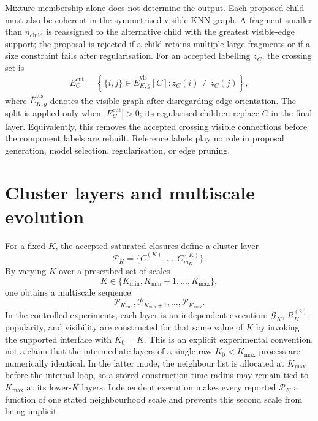 \documentclass[pdflatex,sn-mathphys-num]{sn-jnl}
\newcommand{\calG}{\mathcal{G}}
\newcommand{\calP}{\mathcal{P}}
\begin{document}
Mixture membership alone does not determine the output.  Each proposed child
must also be coherent in the symmetrised visible KNN graph.  A fragment smaller
than $n_{\mathrm{child}}$ is reassigned to the alternative child with the
greatest visible-edge support; the proposal is rejected if a child retains
multiple large fragments or if a size constraint fails after regularisation.
For an accepted labelling $z_C$, the crossing set is
\begin{equation}
E_C^{\mathrm{cut}}=
\left\{\{i,j\}\in\overline E_{K,g}^{\mathrm{vis}}[C]:
z_C(i)\neq z_C(j)\right\},
\label{eq:pruning_cut}
\end{equation}
where $\overline E_{K,g}^{\mathrm{vis}}$ denotes the visible graph after
disregarding edge orientation.  The split is applied only when
$|E_C^{\mathrm{cut}}|>0$; its regularised children replace $C$ in the final
layer.  Equivalently, this removes the accepted crossing visible connections
before the component labels are rebuilt.  Reference labels play no role in
proposal generation, model selection, regularisation, or edge pruning.

\section{Cluster layers and multiscale evolution}\label{sec:layers}

For a fixed $K$, the accepted saturated closures define a cluster layer
\begin{equation}
\calP_K=\{C_1^{(K)},\ldots,C_{m_K}^{(K)}\}.
\end{equation}
By varying $K$ over a prescribed set of scales
\begin{equation}
K\in\{K_{\min},K_{\min}+1,\ldots,K_{\max}\},
\end{equation}
one obtains a multiscale sequence
\begin{equation}
\calP_{K_{\min}},\calP_{K_{\min}+1},\ldots,\calP_{K_{\max}}.
\end{equation}
In the controlled experiments, each layer is an independent execution:
$\calG_K$, $R_K^{(2)}$, popularity, and visibility are constructed for that
same value of $K$ by invoking the supported interface with $K_0=K$.  This is an
explicit experimental convention, not a claim that the intermediate layers of
a single raw $K_0\!<\!K_{\max}$ process are numerically identical.  In the latter
mode, the neighbour list is allocated at $K_{\max}$ before the internal loop,
so a stored construction-time radius may remain tied to $K_{\max}$ at its
lower-$K$ layers.  Independent execution makes every reported $\calP_K$ a
function of one stated neighbourhood scale and prevents this second scale from
being implicit.
\end{document}
